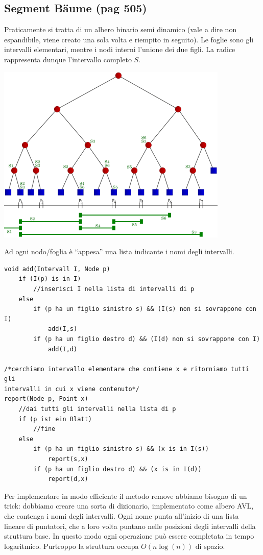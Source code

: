 \documentclass[a4paper]{book}
\newcommand{\lstIndent}{4}
\begin{document}
\subsection{Segment Bäume (pag 505)}
Praticamente si tratta di un albero binario semi dinamico (vale a dire non espandibile, viene creato una sola volta e riempito in seguito). Le foglie sono gli intervalli elementari, mentre i nodi interni l'unione dei due figli. La radice rappresenta dunque l'intervallo completo $S$.
\begin{center}
\includegraphics[scale=0.7]{Figures/segmenttree.png}
\end{center}
Ad ogni nodo/foglia è ``appesa'' una lista indicante i nomi degli intervalli.
\begin{lstlisting}[tabsize=\lstIndent]
void add(Intervall I, Node p)
	if (I(p) is in I)
		//inserisci I nella lista di intervalli di p
	else
		if (p ha un figlio sinistro s) && (I(s) non si sovrappone con I)
			add(I,s)
		if (p ha un figlio destro d) && (I(d) non si sovrappone con I)
			add(I,d)
			
/*cerchiamo intervallo elementare che contiene x e ritorniamo tutti gli 
intervalli in cui x viene contenuto*/			
report(Node p, Point x)
	//dai tutti gli intervalli nella lista di p	
	if (p ist ein Blatt)
		//fine
	else
		if (p ha un figlio sinistro s) && (x is in I(s))
			report(s,x)
		if (p ha un figlio destro d) && (x is in I(d))
			report(d,x)				
\end{lstlisting}
Per implementare in modo efficiente il metodo remove abbiamo bisogno di un trick: dobbiamo creare una sorta di dizionario, implementato come albero AVL, che contenga i nomi degli intervalli. Ogni nome punta all'inizio di una lista lineare di puntatori, che a loro volta puntano nelle posizioni degli intervalli della struttura base. In questo modo ogni operazione può essere completata in tempo logaritmico. Purtroppo la struttura occupa $O(n \log(n))$ di spazio.
\end{document}
